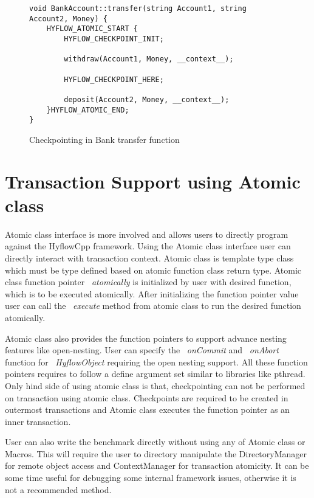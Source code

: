 \documentclass[12pt,english]{report}
\begin{document}
\begin{figure}
\begin{minipage}[b]{0.9\linewidth}\centering
\begin{lstlisting}
void BankAccount::transfer(string Account1, string Account2, Money) {
	HYFLOW_ATOMIC_START {
		HYFLOW_CHECKPOINT_INIT;

		withdraw(Account1, Money, __context__);

		HYFLOW_CHECKPOINT_HERE;
	
		deposit(Account2, Money, __context__);
	}HYFLOW_ATOMIC_END;
}
\end{lstlisting}
\end{minipage}
\caption{Checkpointing in Bank transfer function}
\label{Fig:bankCP}
\end{figure}

\section{Transaction Support using Atomic class}

Atomic class interface is more involved and allows users to directly program against the HyflowCpp framework. Using the Atomic class interface user can directly interact with transaction context. Atomic class is template type class which must be type defined based on atomic function class return type. Atomic class function pointer ~\emph{atomically} is initialized by user with desired function, which is to be executed atomically. After initializing the function pointer value user can call the ~\emph{execute} method from atomic class to run the desired function atomically.

Atomic class also provides the function pointers to support advance nesting features like open-nesting. User can specify the ~\emph{onCommit} and ~\emph{onAbort} function for  ~\emph{HyflowObject} requiring the open nesting support. All these function pointers requires to follow a define argument set similar to libraries like pthread. Only hind side of using atomic class is that, checkpointing can not be performed on transaction using atomic class. Checkpoints are required to be created in outermost transactions and Atomic class executes the function pointer as an inner transaction. 

User can also write the benchmark directly without using any of Atomic class or Macros. This will require the user to directory manipulate the DirectoryManager for remote object access and ContextManager for transaction atomicity. It can be some time useful for debugging some internal framework issues, otherwise it is not a recommended method.
\end{document}
